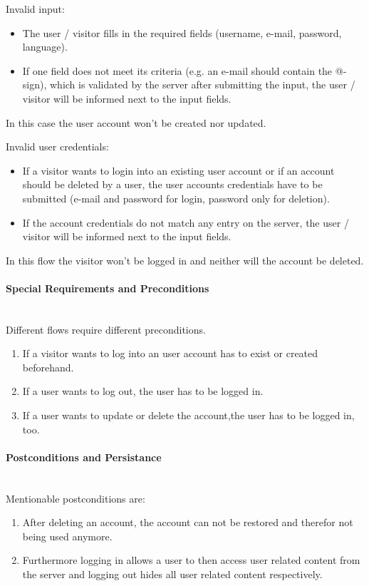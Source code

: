 \noindent
Invalid input: 
\begin{itemize}
	\vspace{-3mm}
	\setlength\itemsep{-1em}
	\item The user / visitor fills in the required fields (username, e-mail, password, language).
	\item If one field does not meet its criteria (e.g. an e-mail should contain the @-sign), which is validated by the server after submitting the input, the user / visitor will be informed next to the input fields.
\end{itemize} 
In this case the user account won't be created nor updated.

\noindent
Invalid user credentials:
\begin{itemize}
	\vspace{-3mm}
	\setlength\itemsep{-1em}
	\item If a visitor wants to login into an existing user account or if an account should be deleted by a user, the user accounts credentials have to be submitted (e-mail and password for login, password only for deletion).
	\item If the account credentials do not match any entry on the server, the user / visitor will be informed next to the input fields.
\end{itemize}
In this flow the visitor won't be logged in and neither will the account be deleted.

\paragraph*{Special Requirements and Preconditions}\mbox{}\\
Different flows require different preconditions.
\begin{enumerate}
	\vspace{-3mm}
	\setlength\itemsep{-1em}
	\item If a visitor wants to log into an user account has to exist or created beforehand.
	\item If a user wants to log out, the user has to be logged in.
	\item If a user wants to update or delete the account,the user has to be logged in, too.
\end{enumerate}

\paragraph*{Postconditions and Persistance}\mbox{}\\
Mentionable postconditions are:
\begin{enumerate}
	\vspace{-3mm}
	\setlength\itemsep{-1em}
	\item After deleting an account, the account can not be restored and therefor not being used anymore.
	\item Furthermore logging in allows a user to then access user related content from the server and logging out hides all user related content respectively.
\end{enumerate}

